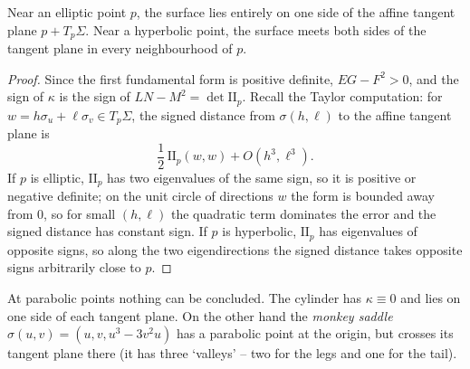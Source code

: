 \documentclass[a4paper]{scrartcl}
\begin{document}
\begin{lemma}
    Near an elliptic point $p$, the surface lies entirely on one side of the affine tangent plane $p + T_p\Sigma$. Near a hyperbolic point, the surface meets both sides of the tangent plane in every neighbourhood of $p$.
\end{lemma}
\begin{proof}
    Since the first fundamental form is positive definite, $EG - F^2 > 0$, and the sign of $\kappa$ is the sign of $LN - M^2 = \det \mathrm{II}_p$. Recall the Taylor computation: for $w = h\sigma_u + \ell \sigma_v \in T_p\Sigma$, the signed distance from $\sigma(h, \ell)$ to the affine tangent plane is
    $$
    \frac{1}{2}\, \mathrm{II}_p(w, w) + O(h^3, \ell^3).
    $$
    If $p$ is elliptic, $\mathrm{II}_p$ has two eigenvalues of the same sign, so it is positive or negative definite; on the unit circle of directions $w$ the form is bounded away from $0$, so for small $(h, \ell)$ the quadratic term dominates the error and the signed distance has constant sign. If $p$ is hyperbolic, $\mathrm{II}_p$ has eigenvalues of opposite signs, so along the two eigendirections the signed distance takes opposite signs arbitrarily close to $p$.
\end{proof}

\begin{remark}
    At parabolic points nothing can be concluded. The cylinder has $\kappa \equiv 0$ and lies on one side of each tangent plane. On the other hand the \emph{monkey saddle} $\sigma(u, v) = (u, v, u^3 - 3v^2u)$ has a parabolic point at the origin, but crosses its tangent plane there (it has three `valleys' -- two for the legs and one for the tail).
\end{remark}
\end{document}
